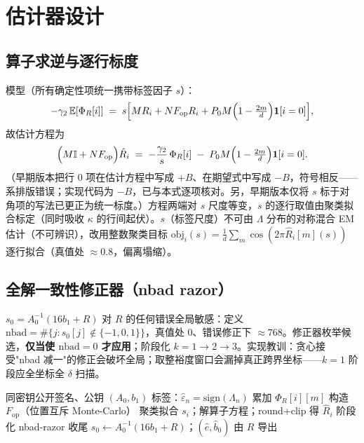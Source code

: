 \documentclass[11pt,a4paper]{ctexart}
\begin{document}
\section{估计器设计}\label{sec:estimator}

\subsection{算子求逆与逐行标度}

模型（所有确定性项统一携带标签因子 $s$）：
\begin{equation}
-\gamma_2\,\mathbb{E}[\Phi_R[i]] \;=\; s\Bigl[M R_i + N F_{\mathrm{op}} R_i + P_0 M\Bigl(1-\tfrac{2m}{d}\Bigr)\mathbf{1}[i=0]\Bigr],
\label{eq:solve-model}
\end{equation}
故估计方程为
\begin{equation}
\Bigl(M\mathbb{I} + N F_{\mathrm{op}}\Bigr)\hat R_i \;=\; -\frac{\gamma_2}{s}\,\Phi_R[i] \; -\; P_0 M\Bigl(1-\tfrac{2m}{d}\Bigr)\mathbf{1}[i=0].
\label{eq:solve}
\end{equation}
（早期版本把行 0 项在估计方程中写成 $+B$、在期望式中写成 $-B$，符号相反——系排版错误；实现代码为 $-B$，已与本式逐项核对。另，早期版本仅将 $s$ 标于对角项的写法已更正为统一标度。）方程两端对 $s$ 尺度等变，$s$ 的逐行取值由聚类拟合标定（同时吸收 $\kappa$ 的行间起伏）。$s$（标签尺度）不可由 $\Lambda$ 分布的对称混合 EM 估计（不可辨识），改用整数聚类目标 $\mathrm{obj}_i(s) = \frac1d\sum_m\cos(2\pi\hat R_i[m](s))$ 逐行拟合（真值处 $\approx0.8$，偏离塌缩）。

\subsection{全解一致性修正器（nbad razor）}

$s_0 = A_0^{-1}(16b_1+R)$ 对 $R$ 的任何错误全局敏感：定义 $\mathrm{nbad} = \#\{j: s_0[j]\notin\{-1,0,1\}\}$，真值处 $0$、错误修正下 $\approx768$。修正器枚举候选，\textbf{仅当使 $\mathrm{nbad}=0$ 才应用}；阶段化 $k=1\to2\to3$。实现教训：贪心接受"nbad 减一"的修正会破坏全局；取整裕度窗口会漏掉真正跨界坐标——$k=1$ 阶段应全坐标全 $\delta$ 扫描。

\begin{algorithm}[htbp]
\caption{BiT-128 公开数据等价私钥恢复（hint 通道路线）}
\begin{algorithmic}[1]
\Require 同密钥公开签名、公钥 $(A_0,b_1)$
\State 标签：$\hat\varepsilon_n = \mathrm{sign}(\Lambda_n)$
\State 累加 $\Phi_R[i][m]$
\State 构造 $F_{\mathrm{op}}$（位置互斥 Monte-Carlo）
  \State 聚类拟合 $s_i$；解算子方程；round+clip 得 $\hat R_i$
\EndFor
\State 阶段化 nbad-razor 收尾
\State $s_0 \leftarrow A_0^{-1}(16b_1+R)$；$(\hat e,\hat b_0)$ 由 $R$ 导出
\end{algorithmic}
\end{algorithm}
\end{document}
